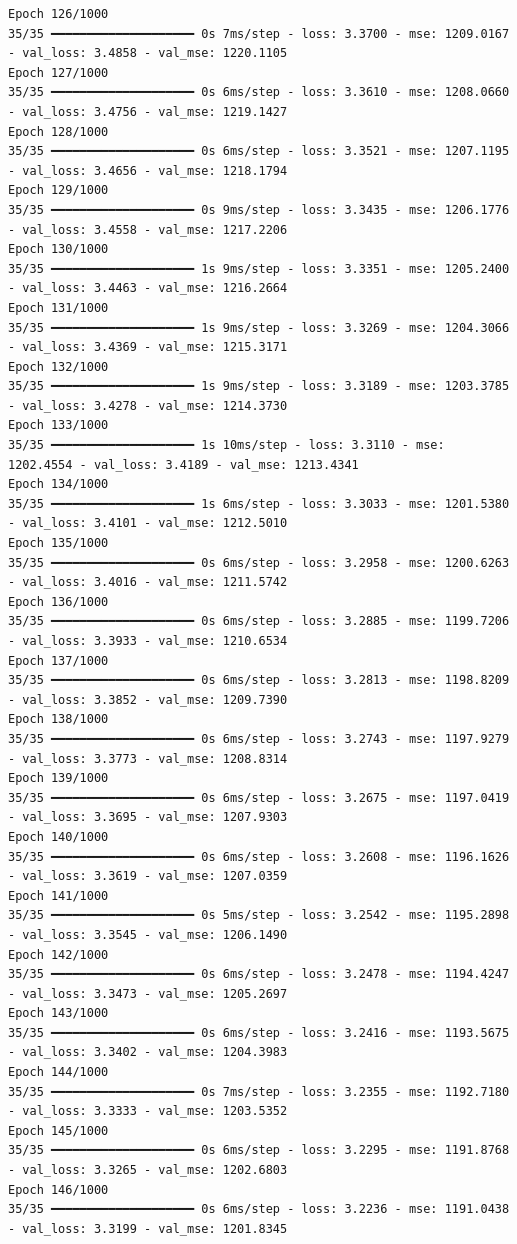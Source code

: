 \documentclass[
  letterpaper,
  DIV=11,
  numbers=noendperiod]{scrreprt}
\begin{document}
\begin{verbatim}
Epoch 126/1000
35/35 ━━━━━━━━━━━━━━━━━━━━ 0s 7ms/step - loss: 3.3700 - mse: 1209.0167 - val_loss: 3.4858 - val_mse: 1220.1105
Epoch 127/1000
35/35 ━━━━━━━━━━━━━━━━━━━━ 0s 6ms/step - loss: 3.3610 - mse: 1208.0660 - val_loss: 3.4756 - val_mse: 1219.1427
Epoch 128/1000
35/35 ━━━━━━━━━━━━━━━━━━━━ 0s 6ms/step - loss: 3.3521 - mse: 1207.1195 - val_loss: 3.4656 - val_mse: 1218.1794
Epoch 129/1000
35/35 ━━━━━━━━━━━━━━━━━━━━ 0s 9ms/step - loss: 3.3435 - mse: 1206.1776 - val_loss: 3.4558 - val_mse: 1217.2206
Epoch 130/1000
35/35 ━━━━━━━━━━━━━━━━━━━━ 1s 9ms/step - loss: 3.3351 - mse: 1205.2400 - val_loss: 3.4463 - val_mse: 1216.2664
Epoch 131/1000
35/35 ━━━━━━━━━━━━━━━━━━━━ 1s 9ms/step - loss: 3.3269 - mse: 1204.3066 - val_loss: 3.4369 - val_mse: 1215.3171
Epoch 132/1000
35/35 ━━━━━━━━━━━━━━━━━━━━ 1s 9ms/step - loss: 3.3189 - mse: 1203.3785 - val_loss: 3.4278 - val_mse: 1214.3730
Epoch 133/1000
35/35 ━━━━━━━━━━━━━━━━━━━━ 1s 10ms/step - loss: 3.3110 - mse: 1202.4554 - val_loss: 3.4189 - val_mse: 1213.4341
Epoch 134/1000
35/35 ━━━━━━━━━━━━━━━━━━━━ 1s 6ms/step - loss: 3.3033 - mse: 1201.5380 - val_loss: 3.4101 - val_mse: 1212.5010
Epoch 135/1000
35/35 ━━━━━━━━━━━━━━━━━━━━ 0s 6ms/step - loss: 3.2958 - mse: 1200.6263 - val_loss: 3.4016 - val_mse: 1211.5742
Epoch 136/1000
35/35 ━━━━━━━━━━━━━━━━━━━━ 0s 6ms/step - loss: 3.2885 - mse: 1199.7206 - val_loss: 3.3933 - val_mse: 1210.6534
Epoch 137/1000
35/35 ━━━━━━━━━━━━━━━━━━━━ 0s 6ms/step - loss: 3.2813 - mse: 1198.8209 - val_loss: 3.3852 - val_mse: 1209.7390
Epoch 138/1000
35/35 ━━━━━━━━━━━━━━━━━━━━ 0s 6ms/step - loss: 3.2743 - mse: 1197.9279 - val_loss: 3.3773 - val_mse: 1208.8314
Epoch 139/1000
35/35 ━━━━━━━━━━━━━━━━━━━━ 0s 6ms/step - loss: 3.2675 - mse: 1197.0419 - val_loss: 3.3695 - val_mse: 1207.9303
Epoch 140/1000
35/35 ━━━━━━━━━━━━━━━━━━━━ 0s 6ms/step - loss: 3.2608 - mse: 1196.1626 - val_loss: 3.3619 - val_mse: 1207.0359
Epoch 141/1000
35/35 ━━━━━━━━━━━━━━━━━━━━ 0s 5ms/step - loss: 3.2542 - mse: 1195.2898 - val_loss: 3.3545 - val_mse: 1206.1490
Epoch 142/1000
35/35 ━━━━━━━━━━━━━━━━━━━━ 0s 6ms/step - loss: 3.2478 - mse: 1194.4247 - val_loss: 3.3473 - val_mse: 1205.2697
Epoch 143/1000
35/35 ━━━━━━━━━━━━━━━━━━━━ 0s 6ms/step - loss: 3.2416 - mse: 1193.5675 - val_loss: 3.3402 - val_mse: 1204.3983
Epoch 144/1000
35/35 ━━━━━━━━━━━━━━━━━━━━ 0s 7ms/step - loss: 3.2355 - mse: 1192.7180 - val_loss: 3.3333 - val_mse: 1203.5352
Epoch 145/1000
35/35 ━━━━━━━━━━━━━━━━━━━━ 0s 6ms/step - loss: 3.2295 - mse: 1191.8768 - val_loss: 3.3265 - val_mse: 1202.6803
Epoch 146/1000
35/35 ━━━━━━━━━━━━━━━━━━━━ 0s 6ms/step - loss: 3.2236 - mse: 1191.0438 - val_loss: 3.3199 - val_mse: 1201.8345

\end{verbatim}
\end{document}
